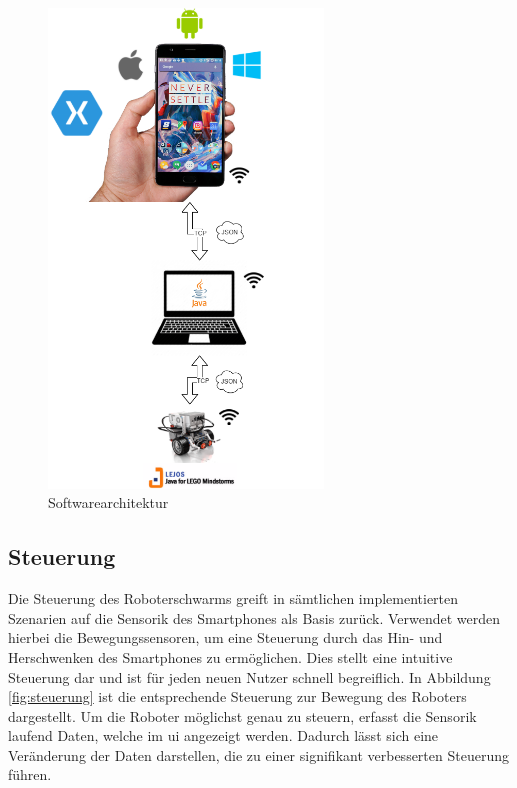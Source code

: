 \newpage
\begin{verbatim}
\end{verbatim}
\begin{figure}[h]
	\centering
	\includegraphics[width=0.65\textwidth]{images/konzeption/Softwarearchitecture.png}
	\caption{Softwarearchitektur}
	\label{fig:softwarearchitecture}
\end{figure}

\newpage
\subsection{Steuerung}

Die Steuerung des Roboterschwarms greift in sämtlichen implementierten Szenarien auf die Sensorik des Smartphones als Basis zurück. Verwendet werden hierbei die Bewegungssensoren, um eine Steuerung durch das Hin- und Herschwenken des Smartphones zu ermöglichen. Dies stellt eine intuitive Steuerung dar und ist für jeden neuen Nutzer schnell begreiflich. In Abbildung \eqref{fig:steuerung} ist die entsprechende Steuerung zur Bewegung des Roboters dargestellt. Um die Roboter möglichst genau zu steuern, erfasst die Sensorik laufend Daten, welche im \gls{ui} angezeigt werden. Dadurch lässt sich eine Veränderung der Daten darstellen, die zu einer signifikant verbesserten Steuerung führen.\\

